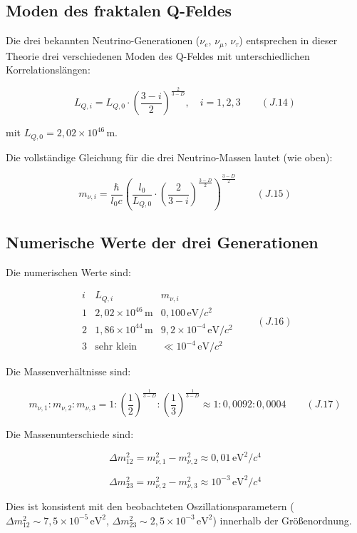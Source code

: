 \subsection{Moden des fraktalen Q-Feldes}
\label{sub:neutrino_oszillation_moden}

Die drei bekannten Neutrino-Generationen (\( \nu_e \), \( \nu_\mu \), \( \nu_\tau \)) entsprechen in dieser Theorie drei verschiedenen Moden des Q-Feldes mit unterschiedlichen Korrelationslängen:

\[
L_{Q,i} = L_{Q,0} \cdot \left(\frac{3-i}{2}\right)^{\frac{2}{3-D}}, \quad i = 1,2,3 \qquad (J.14)
\]

mit \( L_{Q,0} = 2{,}02 \times 10^{46} \, \text{m} \).

Die vollständige Gleichung für die drei Neutrino-Massen lautet (wie oben):

\[
m_{\nu,i} = \frac{\hbar}{l_0 c} \left( \frac{l_0}{L_{Q,0}} \cdot \left(\frac{2}{3-i}\right)^{\frac{3-D}{2}} \right)^{\frac{3-D}{2}} \qquad (J.15)
\]

\subsection{Numerische Werte der drei Generationen}
\label{sub:neutrino_oszillation_generationen_werte}

Die numerischen Werte sind:

\[
\begin{array}{c|c|c}
i & L_{Q,i} & m_{\nu,i} \\
\hline
1 & 2{,}02 \times 10^{46} \, \text{m} & 0{,}100 \, \text{eV}/c^2 \\
2 & 1{,}86 \times 10^{44} \, \text{m} & 9{,}2 \times 10^{-4} \, \text{eV}/c^2 \\
3 & \text{sehr klein} & \ll 10^{-4} \, \text{eV}/c^2
\end{array} \qquad (J.16)
\]

Die Massenverhältnisse sind:

\[
m_{\nu,1} : m_{\nu,2} : m_{\nu,3} = 1 : \left(\frac{1}{2}\right)^{\frac{1}{3-D}} : \left(\frac{1}{3}\right)^{\frac{1}{3-D}} 
\approx 1 : 0{,}0092 : 0{,}0004 \qquad (J.17)
\]

Die Massenunterschiede sind:

\[
\Delta m_{12}^2 = m_{\nu,1}^2 - m_{\nu,2}^2 \approx 0,01 \, \text{eV}^2/c^4
\]

\[
\Delta m_{23}^2 = m_{\nu,2}^2 - m_{\nu,3}^2 \approx 10^{-3} \, \text{eV}^2/c^4
\]

Dies ist konsistent mit den beobachteten Oszillationsparametern (\( \Delta m_{12}^2 \sim 7,5 \times 10^{-5} \, \text{eV}^2 \), \( \Delta m_{23}^2 \sim 2,5 \times 10^{-3} \, \text{eV}^2 \)) innerhalb der Größenordnung.

